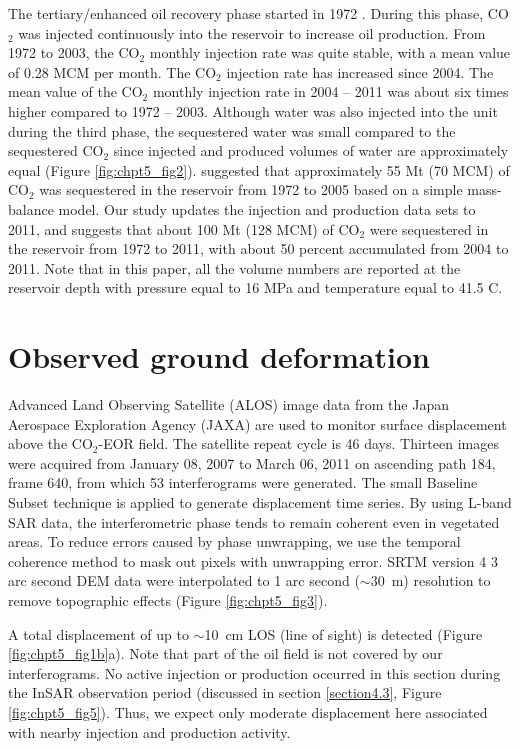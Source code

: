 The tertiary/enhanced oil recovery phase started in 1972 \cite[]{crameik1972carbon}.  During this phase, CO$_{2}$ was injected continuously into the reservoir to increase oil production.  From 1972 to 2003, the CO$_{2}$ monthly injection rate was quite stable, with a mean value of 0.28 MCM per month.  The CO$_{2}$ injection rate has increased since 2004.  The mean value of the CO$_{2}$ monthly injection rate in 2004 – 2011 was about six times higher compared to 1972 – 2003.  Although water was also injected into the unit during the third phase, the sequestered water was small compared to the sequestered CO$_{2}$ since injected and produced volumes of water are approximately equal (Figure \ref{fig:chpt5_fig2}).  \citet{raines66} suggested that approximately 55 Mt (70 MCM) of CO$_{2}$ was sequestered in the reservoir from 1972 to 2005 based on a simple mass-balance model.  Our study updates the injection and production data sets to 2011, and suggests that about 100 Mt (128 MCM) of CO$_{2}$ were sequestered in the reservoir from 1972 to 2011, with about 50 percent accumulated from 2004 to 2011. Note that in this paper, all the volume numbers are reported at the reservoir depth with pressure equal to 16 MPa and temperature equal to 41.5 \textordmasculine C.  

\section{Observed ground deformation}
Advanced Land Observing Satellite (ALOS) image data from the Japan Aerospace Exploration Agency (JAXA) are used to monitor surface displacement above the CO$_{2}$-EOR field.  The satellite repeat cycle is 46 days.  Thirteen images were acquired from January 08, 2007 to March 06, 2011 on ascending path 184, frame 640, from which 53 interferograms were generated.  The small Baseline Subset technique \cite[]{berardino2002new} is applied to generate displacement time series.  By using L-band SAR data, the interferometric phase tends to remain coherent even in vegetated areas. To reduce errors caused by phase unwrapping, we use the temporal coherence method \cite[]{pepe2006extension} to mask out pixels with unwrapping error.  SRTM version 4 \cite[]{reuter2007evaluation} 3 arc second DEM data were interpolated to 1 arc second ($\sim$30~m) resolution to remove topographic effects (Figure \ref{fig:chpt5_fig3}). 

A total displacement of up to $\sim$10~cm LOS (line of sight) is detected (Figure \ref{fig:chpt5_fig1b}a).  Note that part of the oil field is not covered by our interferograms.  No active injection or production occurred in this section during the InSAR observation period (discussed in section \ref{section4.3}, Figure \ref{fig:chpt5_fig5}).  Thus, we expect only moderate displacement here associated with nearby injection and production activity.   

